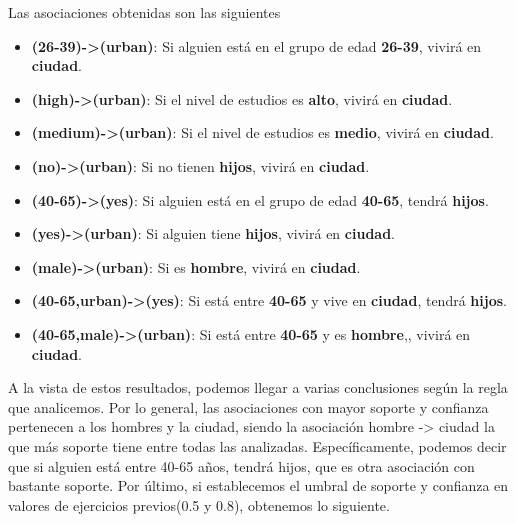 \documentclass [a4paper] {article}
\begin{document}
Las asociaciones obtenidas son las siguientes
\begin{itemize}
\item \textbf{(26-39)->(urban)}: Si alguien está en el grupo de edad \textbf{26-39},
                                vivirá en \textbf{ciudad}.
\item \textbf{(high)->(urban)}: Si el nivel de estudios es \textbf{alto},
                                vivirá en \textbf{ciudad}.
\item \textbf{(medium)->(urban)}: Si el nivel de estudios es \textbf{medio},
                                vivirá en \textbf{ciudad}.
\item \textbf{(no)->(urban)}: Si no tienen \textbf{hijos},
                                vivirá en \textbf{ciudad}.
\item \textbf{(40-65)->(yes)}: Si alguien está en el grupo de edad \textbf{40-65},
                                tendrá \textbf{hijos}.
\item \textbf{(yes)->(urban)}: Si alguien tiene \textbf{hijos},
                                vivirá en \textbf{ciudad}.
\item \textbf{(male)->(urban)}: Si es \textbf{hombre},
                                vivirá en \textbf{ciudad}.
\item \textbf{(40-65,urban)->(yes)}: Si está entre \textbf{40-65} y vive en \textbf{ciudad},
                                 tendrá \textbf{hijos}.
\item \textbf{(40-65,male)->(urban)}: Si está entre \textbf{40-65} y es \textbf{hombre},,
                                vivirá en \textbf{ciudad}.
\end{itemize}
A la vista de estos resultados, podemos llegar a varias conclusiones según la regla que analicemos. 
Por lo general, las asociaciones con mayor soporte y confianza pertenecen a los hombres y la ciudad, siendo
la asociación hombre -> ciudad la que más soporte tiene entre todas las analizadas. Específicamente, podemos
decir que si alguien está entre 40-65 años, tendrá hijos, que es otra asociación con bastante soporte.
Por último, si establecemos el umbral de soporte y confianza en valores de ejercicios previos(0.5 y 0.8), 
obtenemos lo siguiente.
\end{document}
